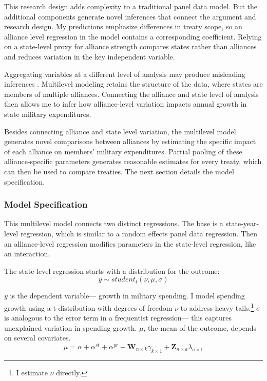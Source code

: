 \documentclass[12pt]{article}
\begin{document}
This research design adds complexity to a traditional panel data model. 
But the additional components generate novel inferences that connect the argument and research design. 
My predictions emphasize differences in treaty scope, so an alliance level regression in the model contains a corresponding coefficient.
Relying on a state-level proxy for alliance strength compares states rather than alliances and reduces variation in the key independent variable.


Aggregating variables at a different level of analysis may produce misleading inferences \citep{McElreath2016}. 
Multilevel modeling retains the structure of the data, where states are members of multiple alliances. 
Connecting the alliance and state level of analysis then allows me to infer how alliance-level variation impacts annual growth in state military expenditures. 


Besides connecting alliance and state level variation, the multilevel model generates novel comparisons between alliances by estimating the specific impact of each alliance on members' military expenditures. 
Partial pooling of these alliance-specific parameters generates reasonable estimates for every treaty, which can then be used to compare treaties. 
The next section details the model specification. 
 


\subsubsection{Model Specification} 

This multilevel model connects two distinct regressions. 
The base is a state-year-level regression, which is similar to a random effects panel data regression.
Then an alliance-level regression modifies parameters in the state-level regression, like an interaction. 


The state-level regression starts with a distribution for the outcome:
\begin{equation}
y \sim student_t(\nu, \mu, \sigma)
\end{equation}
 

$y$ is the dependent variable--- growth in military spending. 
I model spending growth using a t-distribution with degrees of freedom $\nu$ to address heavy tails.\footnote{I estimate $\nu$ directly.}
$\sigma$ is analogous to the error term in a frequentist regression--- this captures unexplained variation in spending growth.  
$\mu$, the mean of the outcome, depends on several covariates.
\begin{equation}
\mu = \alpha + \alpha^{st} + \alpha^{yr} +\textbf{W}_{n \times k} \gamma_{k \times 1}  + \textbf{Z}_{n \times a} \lambda_{a \times 1} 
\end{equation}
\end{document}
